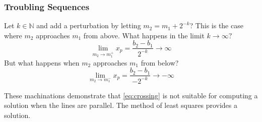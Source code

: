 \subsubsection{Troubling Sequences}  %
Let $k\in\mathbb{N}$ and add a perturbation by letting $m_{2} = m_{1} + 2^{-k}$? This is the case where $m_{2}$ approaches $m_{1}$ from above. What happens in the limit $k\to \infty?$
  \begin{equation*}   %
    \lim_{m_{2}\to m_{1}^{+}} x_{p} = \frac{b_{2} - b_{1}} {2^{-k}} \to \infty
  \end{equation*}
But what happens when $m_{2}$ approaches $m_{1}$ from below? 
  \begin{equation*}   %
    \lim_{m_{2}\to m_{1}^{-}} x_{p} = \frac{b_{2} - b_{1}} {-2^{-k}}  \to -\infty
  \end{equation*}
  
These machinations demonstrate that \eqref{eq:crossing} is not suitable for computing a solution when the lines are parallel. The method of least squares provides a solution.

